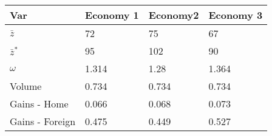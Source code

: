 \begin{tabular}{@{}llll@{}}
\toprule
Var             & Economy 1 & Economy2 & Economy 3 \\ \midrule
$\bar{z}$       & 72        & 75       & 67        \\
$\bar{z}^*$     & 95        & 102      & 90        \\
$\omega$        & 1.314     & 1.28     & 1.364     \\
Volume          & 0.734     & 0.734    & 0.734     \\
Gains - Home    & 0.066     & 0.068    & 0.073     \\
Gains - Foreign & 0.475     & 0.449    & 0.527     \\ \bottomrule
\end{tabular}
